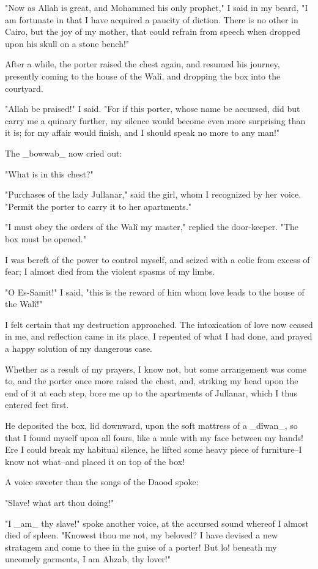 "Now as Allah is great, and Mohammed his only prophet," I said in my
beard, "I am fortunate in that I have acquired a paucity of diction.
There is no other in Cairo, but the joy of my mother, that could
refrain from speech when dropped upon his skull on a stone bench!"

After a while, the porter raised the chest again, and resumed his
journey, presently coming to the house of the Walî, and dropping the
box into the courtyard.

"Allah be praised!" I said. "For if this porter, whose name be
accursed, did but carry me a quinary further, my silence would become
even more surprising than it is; for my affair would finish, and I
should speak no more to any man!"

The _bowwab_ now cried out:

"What is in this chest?"

"Purchases of the lady Jullanar," said the girl, whom I recognized
by her voice. "Permit the porter to carry it to her apartments."

"I must obey the orders of the Walî my master," replied the
door-keeper. "The box must be opened."

I was bereft of the power to control myself, and seized with a colic
from excess of fear; I almost died from the violent spasms of my
limbs.

"O Es-Samit!" I said, "this is the reward of him whom love leads to
the house of the Walî!"

I felt certain that my destruction approached. The intoxication of
love now ceased in me, and reflection came in its place. I repented
of what I had done, and prayed a happy solution of my dangerous case.

Whether as a result of my prayers, I know not, but some arrangement
was come to, and the porter once more raised the chest, and, striking
my head upon the end of it at each step, bore me up to the apartments
of Jullanar, which I thus entered feet first.

He deposited the box, lid downward, upon the soft mattress of a
_dîwan_, so that I found myself upon all fours, like a mule with my
face between my hands! Ere I could break my habitual silence, he
lifted some heavy piece of furniture--I know not what--and placed it
on top of the box!

A voice sweeter than the songs of the Daood spoke:

"Slave! what art thou doing!"

"I _am_ thy slave!" spoke another voice, at the accursed sound whereof
I almost died of spleen. "Knowest thou me not, my beloved? I have
devised a new stratagem and come to thee in the guise of a porter!
But lo! beneath my uncomely garments, I am Ahzab, thy lover!"


